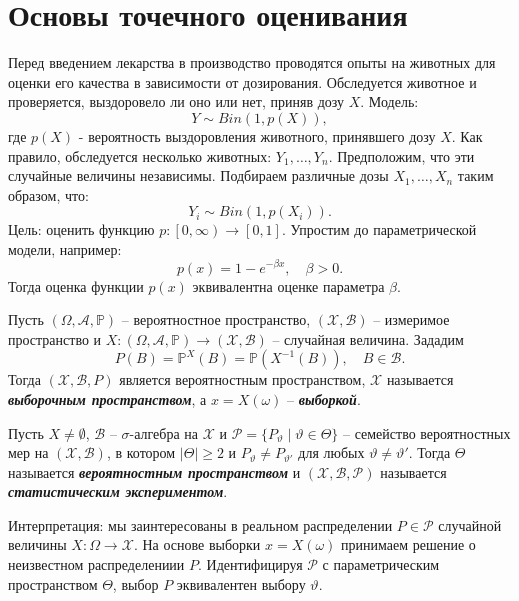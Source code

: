 \graphicspath{{./chapters/chapter02/}}
\chapter{Основы точечного оценивания}

\begin{exmp}
	Перед введением лекарства в производство проводятся опыты на животных для оценки его качества в зависимости от дозирования. Обследуется животное и проверяется, выздоровело ли оно или нет, приняв дозу $X$. Модель:
	\[Y \sim Bin(1, p(X)),\]
	где $p(X)$ - вероятность выздоровления животного, принявшего дозу $X$.
	Как правило, обследуется несколько животных: $Y_1, \dots, Y_n$. Предположим, что эти случайные величины независимы. Подбираем различные дозы $X_1, \dots, X_n$ таким образом, что:
	\[Y_i \sim Bin(1,p(X_i)). \]
	Цель: оценить функцию $p: \left[0, \infty \right) \rightarrow [0, 1]$. Упростим до параметрической модели, например: \[p(x)=1-e^{-\beta x}, \quad \beta>0 .\]
	Тогда оценка функции $p(x)$ эквивалентна оценке параметра $\beta$.
\end{exmp}

\begin{asmp}
	Пусть $(\Omega, \mathcal{A}, \mathbb{P})$ -- вероятностное пространство, $(\mathcal{X}, \mathcal{B})$ -- измеримое пространство и $X\colon(\Omega, \mathcal{A}, \mathbb{P}) \rightarrow (\mathcal{X}, \mathcal{B})$ -- случайная величина. Зададим
	\[P(B)=\mathbb{P}^X(B)=\mathbb{P}(X^{-1}(B)), \quad B \in \mathcal{B}.  \]
	Тогда $(\mathcal{X}, \mathcal{B}, P)$ является вероятностным пространством, $\mathcal{X}$ называется \textbf{\textit{выборочным пространством}}, а $x=X(\omega)$ -- \textbf{\textit{выборкой}}. 
\end{asmp}

\begin{defn}
	Пусть $X \neq \emptyset$, $\mathcal{B}$ -- $\sigma$-алгебра на $\mathcal{X}$ и $\mathcal{P}=\{P_\vartheta \mid \vartheta \in \Theta \}$ -- семейство вероятностных мер на $(\mathcal{X}, \mathcal{B})$, в котором $|\Theta| \geq 2$ и $P_\vartheta \neq P_{\vartheta'}$ для любых $\vartheta \neq \vartheta'$. Тогда $\Theta$ называется \textbf{\textit{вероятностным пространством}} и $(\mathcal{X}, \mathcal{B}, \mathcal{P})$ называется \textbf{\textit{статистическим экспериментом}}.
\end{defn}

\begin{rmrk}
	Интерпретация: мы заинтересованы в реальном распределении $P \in \mathcal{P}$ случайной величины $X\colon\Omega \rightarrow \mathcal{X}.$ На основе выборки $x=X(\omega)$ принимаем решение о неизвестном распределениии $P$. Идентифицируя $\mathcal{P}$ с параметрическим пространством $\Theta$, выбор $P$ эквивалентен выбору $\vartheta$.
	
\end{rmrk}

